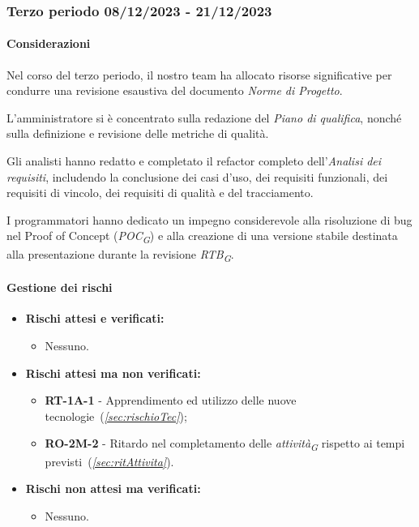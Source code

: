 

\subsubsection{Terzo periodo  08/12/2023 - 21/12/2023}
\paragraph{Considerazioni}
Nel corso del terzo periodo, il nostro team ha allocato risorse significative per condurre una revisione esaustiva del documento \textit{Norme di Progetto}.

\vspace{0.2cm}

L'amministratore si è concentrato sulla redazione del \textit{Piano di qualifica}, nonché sulla definizione e revisione delle metriche di qualità. 

\vspace{0.2cm}

Gli analisti hanno redatto e completato il refactor completo dell'\textit{Analisi dei requisiti}, includendo la conclusione dei casi d'uso, dei requisiti funzionali, dei requisiti di vincolo, dei requisiti di qualità e del tracciamento.

\vspace{0.2cm}

I programmatori hanno dedicato un impegno considerevole alla risoluzione di bug nel Proof of Concept (\textit{POC}\textsubscript{\textit{G}}) e alla creazione di una versione stabile destinata alla presentazione durante la revisione \textit{RTB}\textsubscript{\textit{G}}.

\paragraph{Gestione dei rischi} 

\begin{itemize}
    \item \textbf{Rischi attesi e verificati:}
\begin{itemize}
    \item Nessuno.
\end{itemize}
\item \textbf{Rischi attesi ma non verificati:}
 \begin{itemize}
    \item \textbf{RT-1A-1} - Apprendimento ed utilizzo delle nuove tecnologie~(\textit{\ref{sec:rischioTec}});
    \item \textbf{RO-2M-2} - Ritardo nel completamento delle \textit{attività}\textsubscript{\textit{G}} rispetto ai tempi previsti~(\textit{\ref{sec:ritAttivita}}).
\end{itemize}
\item \textbf{Rischi non attesi ma verificati:}
\begin{itemize}
    \item Nessuno.
\end{itemize}
\end{itemize}
